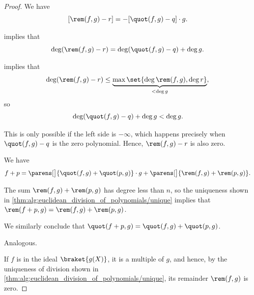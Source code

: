 \begin{proof}
   We have
  \begin{equation}\label{eq:thm:alg:euclidean_division_of_polynomials/unique/proof/diff}
    [\rem(f, g) - r] = -[\quot(f, g) - q] \cdot g.
  \end{equation}

   implies that
  \begin{equation*}
    \deg(\rem(f, g) - r) = \deg(\quot(f, g) - q) + \deg g.
  \end{equation*}

   implies that
  \begin{equation*}
    \deg(\rem(f, g) - r) \leq \underbrace{\max\set{ \deg \rem(f, g), \deg r }}_{< \deg g},
  \end{equation*}
  so
  \begin{equation*}
    \deg(\quot(f, g) - q) + \deg g < \deg g.
  \end{equation*}

  This is only possible if the left side is \( -\infty \), which happens precisely when \( \quot(f, g) - q \) is the zero polynomial. Hence, \( \rem(f, g) - r \) is also zero.


   We have
  \begin{equation*}
    f + p = \parens[\big]{ \quot(f, g) + \quot(p, g) } \cdot g + \parens[\big]{ \rem(f, g) + \rem(p, g) }.
  \end{equation*}

  The sum \( \rem(f, g) + \rem(p, g) \) has degree less than \( n \), so the uniqueness shown in \cref{thm:alg:euclidean_division_of_polynomials/unique} implies that \( \rem(f + p, g) = \rem(f, g) + \rem(p, g) \).

  We similarly conclude that \( \quot(f + p, g) = \quot(f, g) + \quot(p, g) \).

   Analogous.

   If \( f \) is in the ideal \( \braket{ g(X) } \), it is a multiple of \( g \), and hence, by the uniqueness of division shown in \cref{thm:alg:euclidean_division_of_polynomials/unique}, its remainder \( \rem(f, g) \) is zero.


\end{proof}
